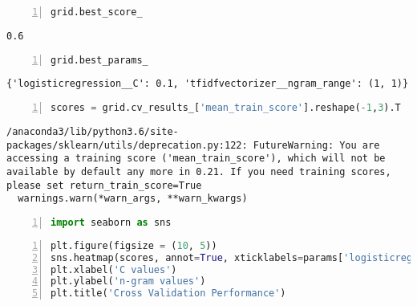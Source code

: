 \documentclass[10pt,parskip=half,
	toc=sectionentrywithdots,
	bibliography=totocnumbered,
	captions=tableheading,numbers=noendperiod]{scrartcl}
\begin{document}
\begin{lstlisting}[language=Python,numbers=left,xleftmargin=20pt,xrightmargin=5pt,belowskip=5pt,aboveskip=5pt]
grid.best_score_
\end{lstlisting}

\begin{lstlisting}[language={},postbreak={},numbers=none,xrightmargin=7pt,breakindent=0pt,aboveskip=5pt,belowskip=5pt]
0.6
\end{lstlisting}

\begin{lstlisting}[language=Python,numbers=left,xleftmargin=20pt,xrightmargin=5pt,belowskip=5pt,aboveskip=5pt]
grid.best_params_
\end{lstlisting}

\begin{lstlisting}[language={},postbreak={},numbers=none,xrightmargin=7pt,breakindent=0pt,aboveskip=5pt,belowskip=5pt]
{'logisticregression__C': 0.1, 'tfidfvectorizer__ngram_range': (1, 1)}
\end{lstlisting}

\begin{lstlisting}[language=Python,numbers=left,xleftmargin=20pt,xrightmargin=5pt,belowskip=5pt,aboveskip=5pt]
scores = grid.cv_results_['mean_train_score'].reshape(-1,3).T
\end{lstlisting}

\begin{lstlisting}[language={},postbreak={},numbers=none,xrightmargin=7pt,belowskip=5pt,aboveskip=5pt,breakindent=0pt]
/anaconda3/lib/python3.6/site-packages/sklearn/utils/deprecation.py:122: FutureWarning: You are accessing a training score ('mean_train_score'), which will not be available by default any more in 0.21. If you need training scores, please set return_train_score=True
  warnings.warn(*warn_args, **warn_kwargs)

\end{lstlisting}

\begin{lstlisting}[language=Python,numbers=left,xleftmargin=20pt,xrightmargin=5pt,belowskip=5pt,aboveskip=5pt]
import seaborn as sns
\end{lstlisting}

\begin{lstlisting}[language=Python,numbers=left,xleftmargin=20pt,xrightmargin=5pt,belowskip=5pt,aboveskip=5pt]
plt.figure(figsize = (10, 5))
sns.heatmap(scores, annot=True, xticklabels=params['logisticregression__C'], yticklabels=params['tfidfvectorizer__ngram_range'])
plt.xlabel('C values')
plt.ylabel('n-gram values')
plt.title('Cross Validation Performance')
\end{lstlisting}
\end{document}
